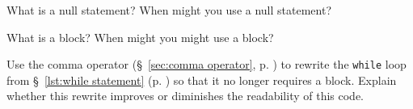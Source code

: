 %
%
\begin{question}
What is a null statement? When might you use a null statement?
\end{question}

\begin{question}
What is a block? When might you might use a block?
\end{question}

\begin{question}
Use the comma operator (\S~\ref{sec:comma operator}, p. \pageref{sec:comma operator}) to rewrite the
\verb|while| loop from \S~\ref{lst:while statement} (p. \pageref{lst:while statement}) so that it no longer requires a block. Explain
whether this rewrite improves or diminishes the readability of this code.
\end{question}
